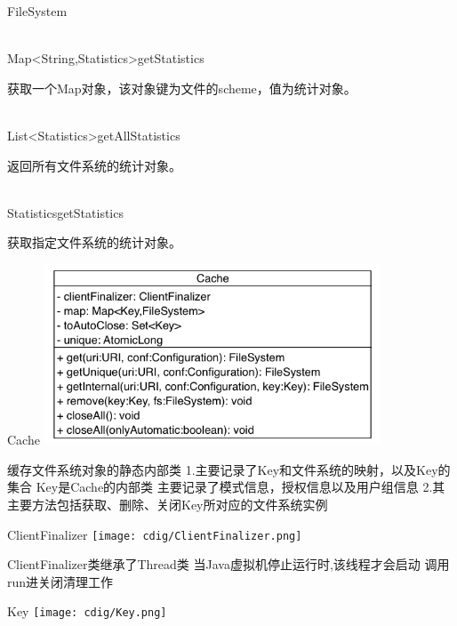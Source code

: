 \begin{XeClass}{FileSystem}
    \begin{XeMethod}{\XePublic \\ \XeSync}{Map<String,Statistics>}{getStatistics}
         
 获取一个Map对象，该对象键为文件的scheme，值为统计对象。

    \end{XeMethod}

    \begin{XeMethod}{\XePublic \\ \XeSync}{List<Statistics>}{getAllStatistics}
         
 返回所有文件系统的统计对象。

    \end{XeMethod}

    \begin{XeMethod}{\XePublic \\ \XeSync}{Statistics}{getStatistics}
         
 获取指定文件系统的统计对象。

    \end{XeMethod}


    \begin{XeInnerClass}{Cache}
\includegraphics[width=10cm]{cdig/Cache.png}
         
 缓存文件系统对象的静态内部类
 1.主要记录了Key和文件系统的映射，以及Key的集合
 Key是Cache的内部类
 主要记录了模式信息，授权信息以及用户组信息
 2.其主要方法包括获取、删除、关闭Key所对应的文件系统实例

        \begin{XeInnerClass}{ClientFinalizer}
\texttt{[image: cdig/ClientFinalizer.png]}
             
 ClientFinalizer类继承了Thread类
 当Java虚拟机停止运行时,该线程才会启动
 调用run进关闭清理工作

        \end{XeInnerClass}
        \begin{XeInnerClass}{Key}
\texttt{[image: cdig/Key.png]}
             

\end{XeInnerClass}
\end{XeInnerClass}
\end{XeClass}
